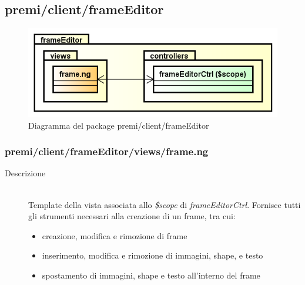 \clearpage
\subsection{premi/client/frameEditor}
\begin{figure}[h]
\begin{center}
\includegraphics[scale=0.55]{img/diapkg/frameEditor.png}
\caption{Diagramma del package premi/client/frameEditor}
\end{center}
\end{figure}

\subsubsection{premi/client/frameEditor/views/frame.ng}

\begin{description}
\item[Descrizione] \hfill \\
	Template della vista associata allo \textit{\$scope} di \textit{frameEditorCtrl}. Fornisce tutti gli strumenti necessari alla creazione di un frame, tra cui:
	\begin{itemize}
			\item creazione, modifica e rimozione di frame
			\item inserimento, modifica e rimozione di immagini, shape, e testo
			\item spostamento di immagini, shape  e testo all'interno del frame
	\end{itemize}
\end{description}








